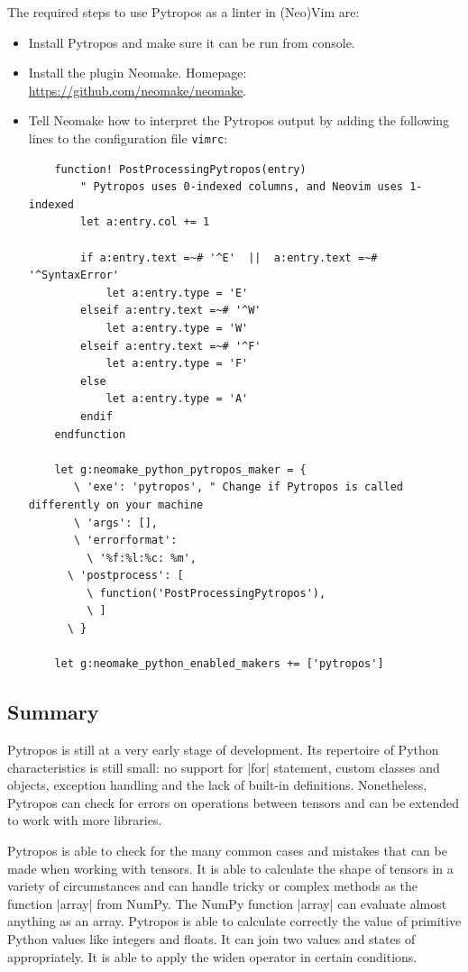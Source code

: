 The required steps to use Pytropos as a linter in (Neo)Vim are:

\begin{itemize}
\tightlist
\item Install Pytropos and make sure it can be run from console.
\item Install the plugin Neomake. Homepage: \url{https://github.com/neomake/neomake}.
\item Tell Neomake how to interpret the Pytropos output by adding the following lines to
  the configuration file \verb|vimrc|:
  \begin{verbatim}
    function! PostProcessingPytropos(entry)
        " Pytropos uses 0-indexed columns, and Neovim uses 1-indexed
        let a:entry.col += 1

        if a:entry.text =~# '^E'  ||  a:entry.text =~# '^SyntaxError'
            let a:entry.type = 'E'
        elseif a:entry.text =~# '^W'
            let a:entry.type = 'W'
        elseif a:entry.text =~# '^F'
            let a:entry.type = 'F'
        else
            let a:entry.type = 'A'
        endif
    endfunction

    let g:neomake_python_pytropos_maker = {
       \ 'exe': 'pytropos', " Change if Pytropos is called differently on your machine
       \ 'args': [],
       \ 'errorformat':
         \ '%f:%l:%c: %m',
      \ 'postprocess': [
         \ function('PostProcessingPytropos'),
         \ ]
      \ }

    let g:neomake_python_enabled_makers += ['pytropos']
  \end{verbatim}
\end{itemize}

\subsection*{Summary}

Pytropos is still at a very early stage of development. Its repertoire of Python
characteristics is still small: no support for \pycode|for| statement, custom classes and
objects, exception handling and the lack of built-in definitions. Nonetheless, Pytropos
can check for errors on operations between tensors and can be extended to work with more
libraries.

Pytropos is able to check for the many common cases and mistakes that can be made when
working with tensors. It is able to calculate the shape of tensors in a variety of
circumstances and can handle tricky or complex methods as the function \pycode|array| from
NumPy. The NumPy function \pycode|array| can evaluate almost anything as an array.
Pytropos is able to calculate correctly the value of primitive Python values like
integers and floats. It can join two values and states of appropriately. It is able to
apply the widen operator in certain conditions.
